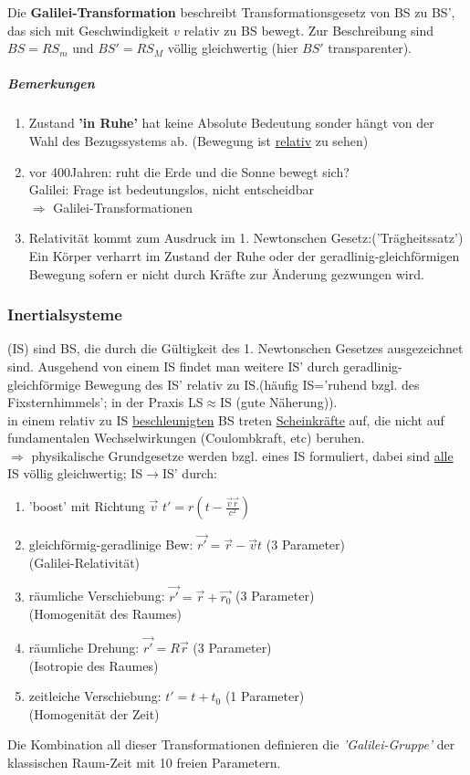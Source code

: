 Die \textbf{Galilei-Transformation} beschreibt Transformationsgesetz von BS zu BS', das sich mit Geschwindigkeit $v$ relativ zu BS bewegt. Zur Beschreibung sind $BS=RS_m$ und $BS'=RS_M$ völlig gleichwertig (hier $BS'$ transparenter).\\
\subparagraph*{Bemerkungen}
\begin{enumerate}
\item Zustand \textbf{'in Ruhe'} hat keine Absolute Bedeutung sonder hängt von der Wahl des Bezugssystems ab. (Bewegung ist \underline{relativ} zu sehen)
\item vor 400Jahren: ruht die Erde und die Sonne bewegt sich?\\
Galilei: Frage ist bedeutungslos, nicht entscheidbar\\
$\Rightarrow$ Galilei-Transformationen
\item Relativität kommt zum Ausdruck im 1. Newtonschen Gesetz:('Trägheitssatz')\\
Ein Körper verharrt im Zustand der Ruhe oder der geradlinig-gleichförmigen Bewegung sofern er nicht durch Kräfte zur Änderung gezwungen wird.
\end{enumerate}
\subsubsection{Inertialsysteme}
(IS) sind BS, die durch die Gültigkeit des 1. Newtonschen Gesetzes ausgezeichnet sind. Ausgehend von einem IS findet man weitere IS' durch geradlinig-gleichförmige Bewegung des IS' relativ zu IS.(häufig IS='ruhend bzgl. des Fixsternhimmels'; in der Praxis LS$\approx$IS (gute Näherung)).\\
in einem relativ zu IS \underline{beschleunigten} BS treten \underline{Scheinkräfte} auf, die nicht auf fundamentalen Wechselwirkungen (Coulombkraft, etc) beruhen.\\
$\Rightarrow$ physikalische Grundgesetze werden bzgl. eines IS formuliert, dabei sind \underline{alle} IS völlig gleichwertig; IS$\rightarrow$IS' durch:
\begin{enumerate}
\item 'boost' mit Richtung $\vec{v}$ $t'=r(t-\frac{\vec{v}\vec{r}}{c^2})$
\item gleichförmig-geradlinige Bew: $\vec{r'}=\vec{r}-\vec{v}t$ (3 Parameter)\\
(Galilei-Relativität)
\item räumliche Verschiebung: $\vec{r'}=\vec{r}+\vec{r_0}$ (3 Parameter)\\
(Homogenität des Raumes)
\item räumliche Drehung: $\vec{r'}=R\vec{r}$ (3 Parameter)\\
(Isotropie des Raumes)
\item zeitleiche Verschiebung: $t'=t+t_0$ (1 Parameter)\\
(Homogenität der Zeit)
\end{enumerate}
Die Kombination all dieser Transformationen definieren die \emph{'Galilei-Gruppe'} der klassischen Raum-Zeit mit 10 freien Parametern.

